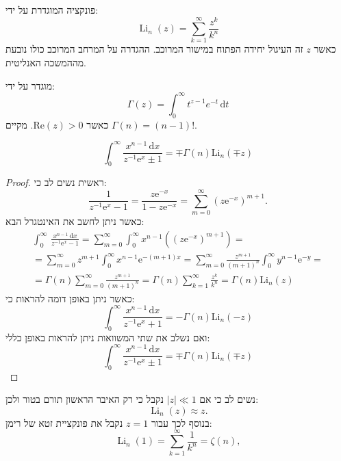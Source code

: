 \documentclass{tstextbook}
\begin{document}
\begin{definition}[פולילוגוריתם]
פונקציה המוגדרת על ידי:
$$\operatorname{Li}_{n}(z)=\sum_{k=1}^{\infty}{\frac{z^{k}}{k^{n}}}$$
כאשר \(z\) זה העיגול יחידה הפתוח במישור המרוכב. ההגדרה על המרחב המרוכב כולו נובעת מההמשכה האנליטית.

\end{definition}
\begin{reminder}
מוגדר על ידי:
$$\Gamma(z)=\int_{0}^{\infty} t^{z-1}e^{ -t } \, \mathrm{d}t $$
כאשר \(\mathrm{Re}(z)>0\). מקיים \(\Gamma(n)=(n-1)!\).

\end{reminder}
\begin{proposition}
$$\int_{0}^{\infty}\frac{x^{n-1}\,\mathrm{d}x}{z^{-1}\mathrm{e}^{x}\pm1}=\mp\Gamma(n)\mathrm{Li}_{n}(\mp z)$$

\end{proposition}
\begin{proof}
ראשית נשים לב כי:
$${\frac{1}{z^{-1}\mathrm{e}^{x}-1}}={\frac{z\mathrm{e}^{-x}}{1-z\mathrm{e}^{-x}}}=\sum_{m=0}^{\infty}(z\mathrm{e}^{-x})^{m+1}.$$
כאשר ניתן לחשב את האינטגרל הבא:
\begin{gather*}\int_{0}^{\infty}\,\frac{x^{n-1}\,\mathrm{d}x}{z^{-1}\mathrm{e}^{x}-1}=\sum_{m=0}^{\infty}\int_{0}^{\infty}x^{n-1}\left( \left( z\mathrm{e}^{-x} \right)^{m+1} \right)=\\=\sum_{m=0}^{\infty}z^{m+1}\int_{0}^{\infty}x^{n-1}\mathrm{e}^{-(m+1)x}=\sum_{m=0}^{\infty}{\frac{z^{m+1}}{(m+1)^{n}}}\int_{0}^{\infty}y^{n-1}\mathrm{e}^{-y}=\\=\Gamma(n)\sum_{m=0}^{\infty}\frac{z^{m+1}}{(m+1)^{n}}=\Gamma(n)\sum_{k=1}^{\infty}\frac{z^{k}}{k^{n}} =\Gamma(n)\mathrm{Li}_{n}(z) 
\end{gather*}
כאשר ניתן באופן דומה להראות כי:
$$\int_{0}^{\infty}\frac{x^{n-1}\,\mathrm{d}x}{z^{-1}\mathrm{e}^{x}+1}=-\Gamma(n)\mathrm{Li}_{n}(-z)$$
ואם נשלב את שתי המשוואות ניתן להראות באופן כללי:
$$\int_{0}^{\infty}\frac{x^{n-1}\,\mathrm{d}x}{z^{-1}\mathrm{e}^{x}\pm1}=\mp\Gamma(n)\mathrm{Li}_{n}(\mp z)$$

\end{proof}
\begin{remark}
נשים לב כי אם \(|z|\ll 1\) נקבל כי רק האיבר הראשון תורם בטור ולכן:
$$\operatorname{Li}_{n}(z)\approx z.$$
בנוסף לכך עבור \(z=1\) נקבל את פונקציית זטא של רימן:
$$\operatorname{Li}_{n}(1)=\sum_{k=1}^{\infty}{\frac{1}{k^{n}}}=\zeta(n),$$

\end{remark}
\end{document}
